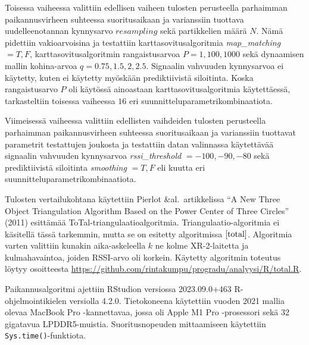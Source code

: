 \documentclass[
  12pt,
  a4paper, twoside]{book}
\begin{document}
Toisessa vaiheessa valittiin edellisen vaiheen tulosten perusteella parhaimman paikannusvirheen suhteessa suoritusaikaan ja varianssiin tuottava uudelleenotannan kynnysarvo \(resampling\) sekä partikkelien määrä \(N\). Nämä pidettiin vakioarvoisina ja testattiin karttasovitusalgoritmia \emph{map\_matching} \(={T,F}\), karttasovitusalgoritmin rangaistusarvoa \(P={1,100,1000}\) sekä dynaamisen mallin kohina-arvoa \(q={0.75,1.5,2,2.5}\). Signaalin vahvuuden kynnysarvoa ei käytetty, kuten ei käytetty myöskään prediktiivistä siloitinta. Koska rangaistusarvo \(P\) oli käytössä ainoastaan karttasovitusalgoritmia käytettäessä, tarkasteltiin toisessa vaiheessa \(16\) eri suunnitteluparametrikombinaatiota.

Viimeisessä vaiheessa valittiin edellisten vaihdeiden tulosten perusteella parhaimman paikannusvirheen suhteessa suoritusaikaan ja varianssiin tuottavat parametrit testattujen joukosta ja testattiin datan valinnassa käytettävää signaalin vahvuuden kynnysarvoa \emph{rssi\_threshold} \(={-100,-90,-80}\) sekä prediktiivistä siloitinta \emph{smoothing} \(={T,F}\) eli kuutta eri suunnitteluparametrikombinaatiota.

Tulosten vertailukohtana käytettiin Pierlot \&al.~artikkelissa ``A New Three Object Triangulation Algorithm Based on the Power Center of Three Circles'' (2011) esittämää ToTal-triangulaatioalgoritmia. \citep{Pierlot-2011} Triangulaatio-algoritmia ei käsitellä tässä tarkemmin, mutta se on esitetty algoritmissa \(\ref{total}\). Algoritmia varten valittiin kunakin aika-askeleella \(k\) ne kolme XR-2-laitetta ja kulmahavaintoa, joiden RSSI-arvo oli korkein. Käytetty algoritmin toteutus löytyy osoitteesta \newline  \url{https://github.com/rintakumpu/progradu/analyysi/R/total.R}.

Paikannusalgoritmi ajettiin RStudion versiossa 2023.09.0+463 R-ohjelmointikielen versiolla 4.2.0. Tietokoneena käytettiin vuoden 2021 mallia olevaa MacBook Pro -kannettavaa, jossa oli Apple M1 Pro -prosessori sekä 32 gigatavua LPDDR5-muistia. Suoritusnopeuden mittaamiseen käytettiin \texttt{Sys.time()}-funktiota.
\end{document}
